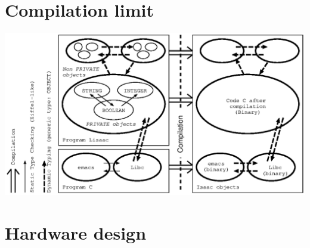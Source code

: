 \documentclass[11pt]{mybook}
\begin{document}
\section{Compilation limit}

\begin{center}
\includegraphics[scale=1.0]{figures/compile}
\end{center}

\section{Hardware design}
\end{document}
